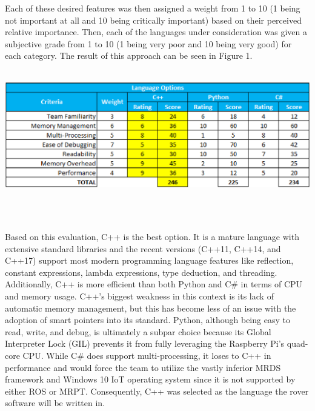 \documentclass[onecolumn, draftclsnofoot,10pt, compsoc]{IEEEtran}
\begin{document}
\par Each of these desired features was then assigned a weight from 1 to 10 (1 being not important at all and 10 being critically important) based on their perceived relative importance. Then, each of the languages under consideration was given a subjective grade from 1 to 10 (1 being very poor and 10 being very good) for each category. The result of this approach can be seen in Figure 1.\\ \\
\begin{minipage}{\linewidth}
\begin{center}
\includegraphics[width=\textwidth]{design_matrix.eps}
\end{center}
\end{minipage}\\ \\
\par Based on this evaluation, C++ is the best option. It is a mature language with extensive standard libraries and the recent versions (C++11, C++14, and C++17) support most modern programming
language features like reflection, constant expressions, lambda expressions, type deduction, and threading. Additionally, C++ is more efficient than both Python and C\# in terms of CPU and memory usage. C++'s biggest weakness in this context is its lack of automatic memory management, but this has become less of an issue with the adoption of smart pointers into its standard. Python, although being easy to read, write, and debug, is ultimately a subpar choice because its Global Interpreter Lock (GIL) prevents it from fully leveraging the Raspberry Pi's quad-core CPU. While C\# does support multi-processing,
it loses to C++ in performance and would force the team to utilize the vastly inferior MRDS framework and Windows 10 IoT operating system since it is not supported by either ROS or MRPT. Consequently, C++ was selected as the language the rover software will be written in.
\end{document}
